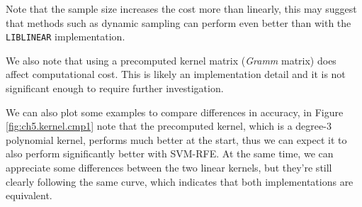 Note that the sample size increases the cost more than linearly, this may suggest that methods such as dynamic sampling can perform even better than with the \texttt{LIBLINEAR} implementation.

We also note that using a precomputed kernel matrix (\emph{Gramm} matrix) does affect computational cost. This is likely an implementation detail and it is not significant enough to require further in\-ves\-ti\-ga\-tion.

We can also plot some examples to compare differences in accuracy, in Figure \ref{fig:ch5.kernel.cmp1} note that the precomputed kernel, which is a degree-3 polynomial kernel, performs much better at the start, thus we can expect it to also perform significantly better with SVM-RFE. At the same time, we can appreciate some differences between the two linear kernels, but they're still clearly following the same curve, which indicates that both implementations are equivalent.  

